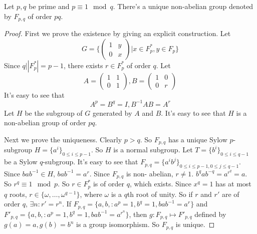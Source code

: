\documentclass[12pt]{book}
\begin{document}
	\begin{theorem}
		Let $p,q$ be prime and $p\equiv 1\mod q$. There's a unique non-abelian group denoted by $F_{p,q}$ of order $pq$. 
	\end{theorem}
	\begin{proof}
		First we prove the existence by giving an explicit construction. Let
		\begin{equation}
			G=\Bigg\{ \begin{pmatrix}
				1&y\\
				0&x
			\end{pmatrix}|x\in F_p^*,y\in F_p
			\Bigg\}
		\end{equation} 
		Since $q\big||F_{p}^*|=p-1$, there exists $r\in F_{p}^*$ of order $q$. Let 
		\begin{equation}
			A=\begin{pmatrix}
				1&1\\
				0&1
			\end{pmatrix}, 
			B=\begin{pmatrix}
				1&0\\
				0&r
			\end{pmatrix}
		\end{equation} 
		It's easy to see that 
		\begin{equation}
			A^p=B^q=I, B^{-1}AB=A^r
		\end{equation}
		Let $H$ be the subgroup of $G$ generated by $A$ and $B$. It's easy to see that $H$ is a non-abelian group of order $pq$.
	
		Next we prove the uniqueness. Clearly $p>q$. So $F_{p,q}$ has a unique Sylow $p$-subgroup $H=\{a^i\}_{0\leq i\leq p-1}$. So $H$ is a normal subgroup. Let $T=\{b^i\}_{0\leq i\leq q-1}$ be a Sylow $q$-subgroup. It's easy to see that $F_{p,q}=\{a^ib^j\}_{0\leq i\leq p-1,0\leq j\leq q-1}$. Since $bab^{-1}\in H$, $bab^{-1}=a^r$. Since $F_{p,q}$ is non- abelian, $r\neq 1$. $b^qab^{-q}=a^{r^q}=a$. So $r^q\equiv 1 \mod p$. So $r\in F_{p}^*$ is of order $q$, which exists. Since $x^q=1$ has at most $q$ roots, $r\in\{\omega,\dots,\omega^{q-1}\}$, where $\omega$ is a $q$th root of unity. So if $r$ and $r'$ are of order $q$, $\exists n: r'=r^n$. If $F_{p,q}=\{a,b,: a^p=1,b^q=1,bab^{-1}=a^r\}$ and $F'_{p,q}=\{a,b,: a^p=1,b^q=1,bab^{-1}=a^{r^n}\}$, then $g:F_{p,q}\mapsto F'_{p,q}$ defined by $g(a)=a, g(b)=b^n$ is a group isomorphism. So $F_{p,q}$ is unique.
	\end{proof}
	
\end{document}
